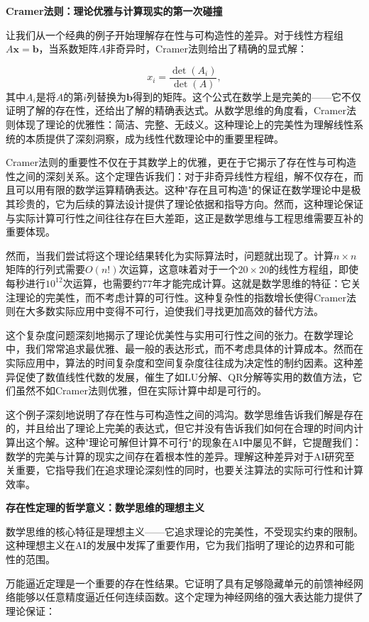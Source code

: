 \textbf{Cramer法则：理论优雅与计算现实的第一次碰撞}

让我们从一个经典的例子开始理解存在性与可构造性的差异。对于线性方程组$A\mathbf{x} = \mathbf{b}$，当系数矩阵$A$非奇异时，Cramer法则给出了精确的显式解：

$$x_i = \frac{\det(A_i)}{\det(A)},$$
其中$A_i$是将$A$的第$i$列替换为$\mathbf{b}$得到的矩阵。这个公式在数学上是完美的——它不仅证明了解的存在性，还给出了解的精确表达式。从数学思维的角度看，Cramer法则体现了理论的优雅性：简洁、完整、无歧义。这种理论上的完美性为理解线性系统的本质提供了深刻洞察，成为线性代数理论中的重要里程碑。

Cramer法则的重要性不仅在于其数学上的优雅，更在于它揭示了存在性与可构造性之间的深刻关系。这个定理告诉我们：对于非奇异线性方程组，解不仅存在，而且可以用有限的数学运算精确表达。这种"存在且可构造"的保证在数学理论中是极其珍贵的，它为后续的算法设计提供了理论依据和指导方向。然而，这种理论保证与实际计算可行性之间往往存在巨大差距，这正是数学思维与工程思维需要互补的重要体现。

然而，当我们尝试将这个理论结果转化为实际算法时，问题就出现了。计算$n \times n$矩阵的行列式需要$O(n!)$次运算，这意味着对于一个$20 \times 20$的线性方程组，即使每秒进行$10^{12}$次运算，也需要约$77$年才能完成计算。这就是数学思维的特征：它关注理论的完美性，而不考虑计算的可行性。这种复杂性的指数增长使得Cramer法则在大多数实际应用中变得不可行，迫使我们寻找更加高效的替代方法。

这个复杂度问题深刻地揭示了理论优美性与实用可行性之间的张力。在数学理论中，我们常常追求最优雅、最一般的表达形式，而不考虑具体的计算成本。然而在实际应用中，算法的时间复杂度和空间复杂度往往成为决定性的制约因素。这种差异促使了数值线性代数的发展，催生了如LU分解、QR分解等实用的数值方法，它们虽然不如Cramer法则优雅，但在实际计算中却是可行的。

这个例子深刻地说明了存在性与可构造性之间的鸿沟。数学思维告诉我们解是存在的，并且给出了理论上完美的表达式，但它并没有告诉我们如何在合理的时间内计算出这个解。这种"理论可解但计算不可行"的现象在AI中屡见不鲜，它提醒我们：数学的完美与计算的现实之间存在着根本性的差异。理解这种差异对于AI研究至关重要，它指导我们在追求理论深刻性的同时，也要关注算法的实际可行性和计算效率。

\textbf{存在性定理的哲学意义：数学思维的理想主义}

数学思维的核心特征是理想主义——它追求理论的完美性，不受现实约束的限制。这种理想主义在AI的发展中发挥了重要作用，它为我们指明了理论的边界和可能性的范围。

万能逼近定理是一个重要的存在性结果。它证明了具有足够隐藏单元的前馈神经网络能够以任意精度逼近任何连续函数。这个定理为神经网络的强大表达能力提供了理论保证：

